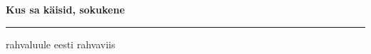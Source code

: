 \documentclass[10pt]{book}
\begin{document}
{
  \samepage
  \raggedbottom
  \raggedright
  \sloppy


  \vspace{0.2in}

  \noindent\begin{minipage}{.1\textwidth}
    \hfill\vspace{0.1in}
  \end{minipage}%
  \noindent\begin{minipage}{.8\textwidth}
    \centering
    \bfseries
    \large Kus sa k\"aisid, sokukene
  \end{minipage}%
  \noindent\begin{minipage}{.1\textwidth}
      \hfill\vspace{0.1in}
  \end{minipage}

  \nopagebreak[4]
  \vspace{0.1in}
  \nopagebreak[4]
  \hrule height 0.05ex
  \nopagebreak[4]
  \vspace{-0.05in}

  {\footnotesize rahvaluule \hfill eesti rahvaviis }\\
  \vspace{0.01in}



}
\end{document}
